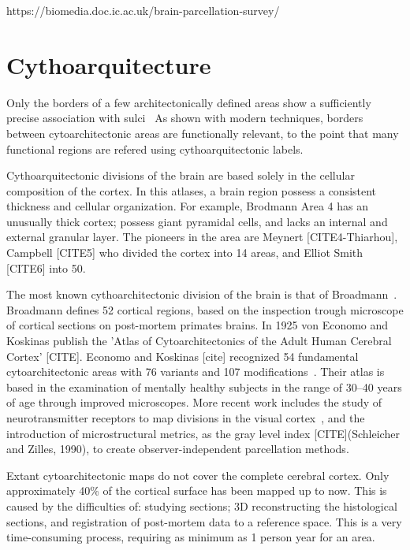 https://biomedia.doc.ic.ac.uk/brain-parcellation-survey/


\section{Cythoarquitecture}
\label{sec:cyto_maps}
Only the borders of a few architectonically defined areas show a sufficiently precise association with sulci~\cite{Amunts2007}
As shown with modern techniques, borders between cytoarchitectonic areas are functionally relevant, to the point that many functional regions are refered using cythoarquitectonic labels.

Cythoarquitectonic divisions of the brain are based solely in the cellular
composition of the cortex. In this atlases, a brain region possess a consistent
thickness and cellular organization. For example, Brodmann Area 4 has an unusually
thick cortex; possess giant pyramidal cells, and lacks an internal and external
granular layer. The pioneers in the area are Meynert [CITE4-Thiarhou],
Campbell [CITE5] who divided the cortex into 14 areas, and Elliot Smith [CITE6]
into 50.

The most known cythoarchitectonic division of the brain is that
of Broadmann~\cite{Brodmann1909}. Broadmann defines 52 cortical regions, based
on the inspection trough microscope of cortical sections on post-mortem
primates brains. In 1925 von Economo and Koskinas publish the 'Atlas of 
Cytoarchitectonics of the Adult Human Cerebral Cortex' [CITE]. Economo and
Koskinas [cite] recognized 54 fundamental cytoarchitectonic areas with 76
variants and 107 modifications~\cite{Triarhou2007}. Their atlas is based in the
examination of mentally healthy subjects in the range of 30–40 years of age
through improved microscopes. More recent work includes the study of
neurotransmitter receptors to map divisions in the visual cortex~\cite{Eickhoff2008},
and the introduction of microstructural metrics, as the gray level index
[CITE](Schleicher and Zilles, 1990), to create observer-independent parcellation
methods.

Extant cytoarchitectonic maps do not cover the complete cerebral cortex. 
Only approximately 40\% of the cortical surface has been mapped up to now. 
This is caused by the difficulties of: studying sections; 3D reconstructing the
histological sections, and registration of post-mortem data to a reference space.
This is a very time-consuming process, requiring as minimum as 1 person year for
an area.


